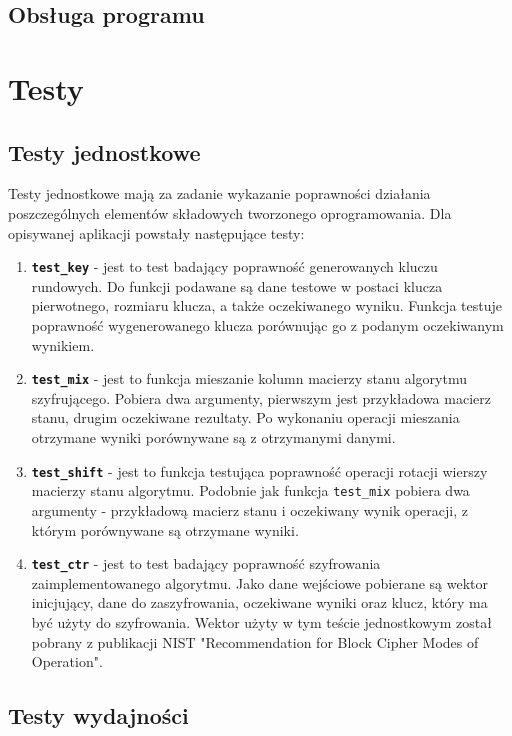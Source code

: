 \documentclass[a4paper,12pt]{article}
\begin{document}
\subsection{Obsługa programu}

\section{Testy}

\subsection{Testy jednostkowe}

Testy jednostkowe mają za zadanie wykazanie poprawności działania poszczególnych elementów składowych tworzonego oprogramowania.  Dla opisywanej aplikacji powstały następujące testy:
\begin{enumerate}
\item \textbf{\texttt{test\_key}} - jest to test badający poprawność generowanych kluczu rundowych. Do funkcji podawane są dane testowe w postaci klucza pierwotnego, rozmiaru klucza, a także oczekiwanego wyniku. Funkcja testuje poprawność wygenerowanego klucza porównując go z podanym oczekiwanym wynikiem. 
\item \textbf{\texttt{test\_mix}} - jest to funkcja mieszanie kolumn macierzy stanu algorytmu szyfrującego. Pobiera dwa argumenty, pierwszym jest przykładowa macierz stanu, drugim oczekiwane rezultaty. Po wykonaniu operacji mieszania otrzymane wyniki porównywane są z otrzymanymi danymi.
\item \textbf{\texttt{test\_shift}} - jest to funkcja testująca poprawność operacji rotacji wierszy macierzy stanu algorytmu. Podobnie jak funkcja \texttt{test\_mix} pobiera dwa argumenty - przykładową macierz stanu i oczekiwany wynik operacji, z którym porównywane są otrzymane wyniki.
\item \textbf{\texttt{test\_ctr}} - jest to test badający poprawność szyfrowania zaimplementowanego algorytmu. Jako dane wejściowe pobierane są wektor inicjujący, dane do zaszyfrowania, oczekiwane wyniki oraz klucz, który ma być użyty do szyfrowania. Wektor użyty w tym teście jednostkowym został pobrany z publikacji NIST "Recommendation for Block Cipher Modes of Operation".
\end{enumerate}

\subsection{Testy wydajności}
\end{document}
